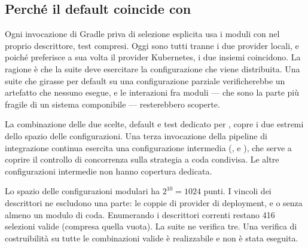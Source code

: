 \subsection{Perch\'e il default coincide con }

Ogni invocazione di Gradle priva di selezione esplicita usa i moduli con
 nel proprio descrittore, test compresi. Oggi sono
tutti tranne i due provider locali, e poich\'e  preferisce a sua volta il
provider Kubernetes, i due insiemi coincidono. La ragione \`e che la suite deve esercitare la configurazione che viene
distribuita. Una suite che girasse per default su una configurazione parziale
verificherebbe un artefatto che nessuno esegue, e le interazioni fra moduli ---
che sono la parte pi\`u fragile di un sistema componibile --- resterebbero
scoperte.

La combinazione delle due scelte, default e test dedicato per
, copre i due estremi dello spazio delle configurazioni. Una terza
invocazione della pipeline di integrazione continua esercita una configurazione
intermedia (,  e
), che serve a coprire il controllo di concorrenza sulla
strategia a coda condivisa. Le altre configurazioni intermedie non hanno copertura
dedicata.

\begin{damisurare}
Lo spazio delle configurazioni modulari ha $2^{10} = 1024$ punti. I vincoli dei
descrittori ne escludono una parte: le coppie di provider di deployment, e
 o  senza almeno un modulo di coda.
Enumerando i descrittori correnti restano 416 selezioni valide (compresa quella
vuota). La suite ne verifica tre. Una verifica di costruibilit\`a su tutte le
combinazioni valide \`e realizzabile e non \`e stata eseguita.
\end{damisurare}
